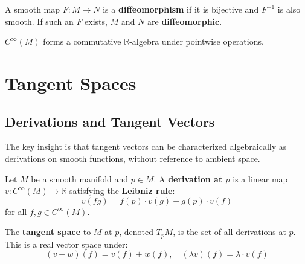 \begin{definition}[Diffeomorphism]
    A smooth map $F: M \to N$ is a \textbf{diffeomorphism} if it is bijective and $F^{-1}$ is also smooth. If such an $F$ exists, $M$ and $N$ are \textbf{diffeomorphic}.
\end{definition}

\begin{remark}
    $C^\infty(M)$ forms a commutative $\mathbb{R}$-algebra under pointwise operations.
\end{remark}

\chapter{Tangent Spaces}

\section{Derivations and Tangent Vectors}

The key insight is that tangent vectors can be characterized algebraically as derivations on smooth functions, without reference to ambient space.

\begin{definition}
    Let $M$ be a smooth manifold and $p \in M$. A \textbf{derivation at $p$} is a linear map $v: C^\infty(M) \to \mathbb{R}$ satisfying the \textbf{Leibniz rule}:
    \[
        v(fg) = f(p) \cdot v(g) + g(p) \cdot v(f)
    \]
    for all $f, g \in C^\infty(M)$.
\end{definition}

\begin{definition}
    The \textbf{tangent space} to $M$ at $p$, denoted $T_pM$, is the set of all derivations at $p$. This is a real vector space under:
    \[
        (v + w)(f) = v(f) + w(f), \quad (\lambda v)(f) = \lambda \cdot v(f)
    \]
\end{definition}

